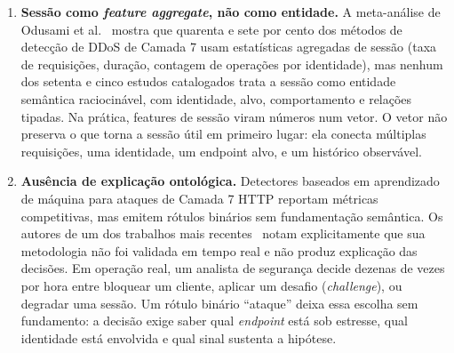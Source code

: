 \documentclass[preprint,12pt]{elsarticle}
\begin{document}
\begin{enumerate}
    \item \textbf{Sessão como \emph{feature aggregate}, não como entidade.} A meta-análise de Odusami et al.~\cite{odusami2020survey} mostra que quarenta e sete por cento dos métodos de detecção de DDoS de Camada 7 usam estatísticas agregadas de sessão (taxa de requisições, duração, contagem de operações por identidade), mas nenhum dos setenta e cinco estudos catalogados trata a sessão como entidade semântica raciocinável, com identidade, alvo, comportamento e relações tipadas. Na prática, features de sessão viram números num vetor. O vetor não preserva o que torna a sessão útil em primeiro lugar: ela conecta múltiplas requisições, uma identidade, um endpoint alvo, e um histórico observável.
    \item \textbf{Ausência de explicação ontológica.} Detectores baseados em aprendizado de máquina para ataques de Camada 7 HTTP reportam métricas competitivas, mas emitem rótulos binários sem fundamentação semântica. Os autores de um dos trabalhos mais recentes~\cite{kemp2023approach} notam explicitamente que sua metodologia não foi validada em tempo real e não produz explicação das decisões. Em operação real, um analista de segurança decide dezenas de vezes por hora entre bloquear um cliente, aplicar um desafio (\emph{challenge}), ou degradar uma sessão. Um rótulo binário ``ataque'' deixa essa escolha sem fundamento: a decisão exige saber qual \emph{endpoint} está sob estresse, qual identidade está envolvida e qual sinal sustenta a hipótese.

\end{enumerate}
\end{document}

